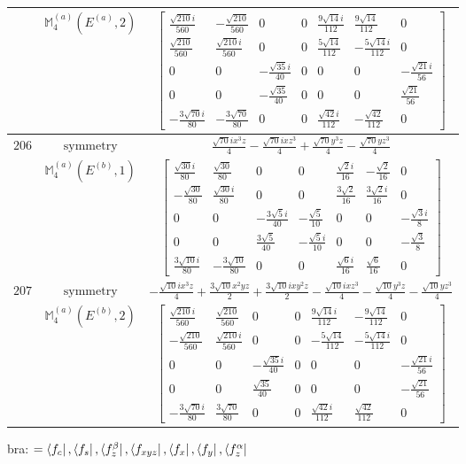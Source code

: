 \documentclass[fleqn,8pt,landscape]{jsarticle}
\begin{document}
\begin{longtable}{ccc}
$  $ & $ \mathbb{M}_{4}^{(a)}(E^{(a)},2) $ & $ \begin{bmatrix} \frac{\sqrt{210} i}{560} & - \frac{\sqrt{210}}{560} & 0 & 0 & \frac{9 \sqrt{14} i}{112} & \frac{9 \sqrt{14}}{112} & 0 \\ \frac{\sqrt{210}}{560} & \frac{\sqrt{210} i}{560} & 0 & 0 & \frac{5 \sqrt{14}}{112} & - \frac{5 \sqrt{14} i}{112} & 0 \\ 0 & 0 & - \frac{\sqrt{35} i}{40} & 0 & 0 & 0 & - \frac{\sqrt{21} i}{56} \\ 0 & 0 & - \frac{\sqrt{35}}{40} & 0 & 0 & 0 & \frac{\sqrt{21}}{56} \\ - \frac{3 \sqrt{70} i}{80} & - \frac{3 \sqrt{70}}{80} & 0 & 0 & \frac{\sqrt{42} i}{112} & - \frac{\sqrt{42}}{112} & 0 \end{bmatrix} $ \\ \hline
$ 206 $ & $ \text{symmetry} $ & $ \frac{\sqrt{70} i x^{3} z}{4} - \frac{\sqrt{70} i x z^{3}}{4} + \frac{\sqrt{70} y^{3} z}{4} - \frac{\sqrt{70} y z^{3}}{4} $ \\
$  $ & $ \mathbb{M}_{4}^{(a)}(E^{(b)},1) $ & $ \begin{bmatrix} \frac{\sqrt{30} i}{80} & \frac{\sqrt{30}}{80} & 0 & 0 & \frac{\sqrt{2} i}{16} & - \frac{\sqrt{2}}{16} & 0 \\ - \frac{\sqrt{30}}{80} & \frac{\sqrt{30} i}{80} & 0 & 0 & \frac{3 \sqrt{2}}{16} & \frac{3 \sqrt{2} i}{16} & 0 \\ 0 & 0 & - \frac{3 \sqrt{5} i}{40} & - \frac{\sqrt{5}}{10} & 0 & 0 & - \frac{\sqrt{3} i}{8} \\ 0 & 0 & \frac{3 \sqrt{5}}{40} & - \frac{\sqrt{5} i}{10} & 0 & 0 & - \frac{\sqrt{3}}{8} \\ \frac{3 \sqrt{10} i}{80} & - \frac{3 \sqrt{10}}{80} & 0 & 0 & \frac{\sqrt{6} i}{16} & \frac{\sqrt{6}}{16} & 0 \end{bmatrix} $ \\ \hline
$ 207 $ & $ \text{symmetry} $ & $ - \frac{\sqrt{10} i x^{3} z}{4} + \frac{3 \sqrt{10} x^{2} y z}{2} + \frac{3 \sqrt{10} i x y^{2} z}{2} - \frac{\sqrt{10} i x z^{3}}{4} - \frac{\sqrt{10} y^{3} z}{4} - \frac{\sqrt{10} y z^{3}}{4} $ \\
$  $ & $ \mathbb{M}_{4}^{(a)}(E^{(b)},2) $ & $ \begin{bmatrix} \frac{\sqrt{210} i}{560} & \frac{\sqrt{210}}{560} & 0 & 0 & \frac{9 \sqrt{14} i}{112} & - \frac{9 \sqrt{14}}{112} & 0 \\ - \frac{\sqrt{210}}{560} & \frac{\sqrt{210} i}{560} & 0 & 0 & - \frac{5 \sqrt{14}}{112} & - \frac{5 \sqrt{14} i}{112} & 0 \\ 0 & 0 & - \frac{\sqrt{35} i}{40} & 0 & 0 & 0 & - \frac{\sqrt{21} i}{56} \\ 0 & 0 & \frac{\sqrt{35}}{40} & 0 & 0 & 0 & - \frac{\sqrt{21}}{56} \\ - \frac{3 \sqrt{70} i}{80} & \frac{3 \sqrt{70}}{80} & 0 & 0 & \frac{\sqrt{42} i}{112} & \frac{\sqrt{42}}{112} & 0 \end{bmatrix} $ \\ \hline
\end{longtable}
bra: $=\bra{f_{c}}, \bra{f_{s}}, \bra{f_{z}^{\beta}}, \bra{f_{xyz}}, \bra{f_{x}}, \bra{f_{y}}, \bra{f_{z}^{\alpha}}$
\end{document}
